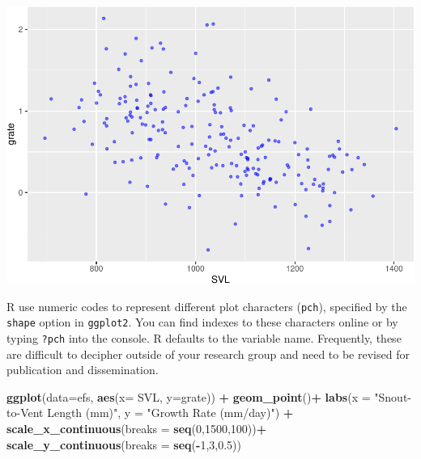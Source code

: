 \documentclass[
]{book}
\newenvironment{Shaded}{\begin{snugshade}}{\end{snugshade}}
\newcommand{\AttributeTok}[1]{\textcolor[rgb]{0.13,0.29,0.53}{#1}}
\newcommand{\DecValTok}[1]{\textcolor[rgb]{0.00,0.00,0.81}{#1}}
\newcommand{\FloatTok}[1]{\textcolor[rgb]{0.00,0.00,0.81}{#1}}
\newcommand{\FunctionTok}[1]{\textcolor[rgb]{0.13,0.29,0.53}{\textbf{#1}}}
\newcommand{\NormalTok}[1]{#1}
\newcommand{\SpecialCharTok}[1]{\textcolor[rgb]{0.81,0.36,0.00}{\textbf{#1}}}
\newcommand{\StringTok}[1]{\textcolor[rgb]{0.31,0.60,0.02}{#1}}
\begin{document}
\includegraphics{series_files/figure-latex/unnamed-chunk-24-1.pdf}

R use numeric codes to represent different plot characters (\texttt{pch}), specified by the \texttt{shape} option in \texttt{ggplot2}. You can find indexes to these characters online or by typing \texttt{?pch} into the console. R defaults to the variable name. Frequently, these are difficult to decipher outside of your research group and need to be revised for publication and dissemination.

\begin{Shaded}
\begin{Highlighting}[]
\FunctionTok{ggplot}\NormalTok{(}\AttributeTok{data=}\NormalTok{efs, }\FunctionTok{aes}\NormalTok{(}\AttributeTok{x=}\NormalTok{ SVL, }\AttributeTok{y=}\NormalTok{grate)) }\SpecialCharTok{+}   
    \FunctionTok{geom\_point}\NormalTok{()}\SpecialCharTok{+}
    \FunctionTok{labs}\NormalTok{(}\AttributeTok{x =} \StringTok{"Snout{-}to{-}Vent Length (mm)"}\NormalTok{,}
         \AttributeTok{y =} \StringTok{"Growth Rate (mm/day)"}\NormalTok{) }\SpecialCharTok{+}
    \FunctionTok{scale\_x\_continuous}\NormalTok{(}\AttributeTok{breaks =} \FunctionTok{seq}\NormalTok{(}\DecValTok{0}\NormalTok{,}\DecValTok{1500}\NormalTok{,}\DecValTok{100}\NormalTok{))}\SpecialCharTok{+}
    \FunctionTok{scale\_y\_continuous}\NormalTok{(}\AttributeTok{breaks =} \FunctionTok{seq}\NormalTok{(}\SpecialCharTok{{-}}\DecValTok{1}\NormalTok{,}\DecValTok{3}\NormalTok{,}\FloatTok{0.5}\NormalTok{))}
\end{Highlighting}
\end{Shaded}
\end{document}
